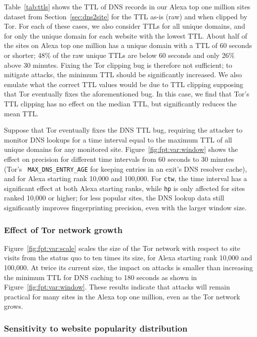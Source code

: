 Table~\ref{tab:ttls} shows the TTL of DNS records in our Alexa top one million
sites dataset from Section~\ref{sec:dns2site} for the
TTL as-is (raw) and when clipped by Tor.  For each of these cases, we
also consider TTLs for all unique domains, and for only the unique
domain for each website with the lowest TTL.  About half of the sites on
Alexa top one million has a unique domain with a TTL of 60 seconds or
shorter; 48\% of the raw unique TTLs are below 60 seconds and only 26\%
above 30 minutes. Fixing the Tor clipping bug is therefore not
sufficient; to mitigate \name attacks, the minimum TTL should be
significantly increased.  We also emulate what the correct TTL values
would be due to TTL clipping supposing that Tor eventually fixes the
aforementioned bug.  In this case, we find that Tor's TTL clipping has
no effect on the median TTL, but significantly reduces the mean TTL.

Suppose that Tor eventually fixes the DNS TTL bug, requiring the
attacker to monitor DNS lookups for a time interval equal to the maximum
TTL of all unique domains for any monitored site.
Figure~\ref{fig:fpt:var:window} shows the effect on precision for
different time intervals from 60 seconds to 30 minutes (Tor's {\tt
  MAX\_DNS\_ENTRY\_AGE} for keeping entries in an exit's DNS resolver
cache), and for Alexa starting rank 10,000 and 100,000. For \texttt{ctw},
the time interval has a significant effect at both Alexa starting ranks,
while \texttt{hp} is only affected for sites ranked 10,000 or higher;
for less popular sites, the DNS lookup data still significantly improves
fingerprinting precision, even with the larger window size.

\subsubsection{Effect of Tor network growth}
Figure~\ref{fig:fpt:var:scale} scales the size of the Tor network with
respect to site
visits from the status quo to ten times its size, for Alexa starting rank 10,000 and
100,000. At twice its current size, the impact on \name attacks is smaller than
increasing the minimum TTL for DNS caching to 180 seconds as shown in
Figure~\ref{fig:fpt:var:window}. These results indicate that \name
attacks will remain
practical for many sites in the Alexa top one million, even as the Tor network grows.


\subsubsection{Sensitivity to website popularity distribution}


